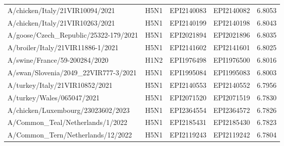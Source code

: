 \begin{tabular}{L{1.95in}|L{.25in}|L{.60in}|L{.6in}|C{1in}}
A/chicken/Italy/21VIR10094/2021&H5N1&EPI2140083&EPI2140082&6.8053\\
A/chicken/Italy/21VIR10263/2021&H5N1&EPI2140199&EPI2140198&6.8043\\
A/goose/Czech\_Republic/25322-179/2021&H5N1&EPI2021894&EPI2021896&6.8035\\
A/broiler/Italy/21VIR11886-1/2021&H5N1&EPI2141602&EPI2141601&6.8025\\
A/swine/France/59-200284/2020&H1N2&EPI1976498&EPI1976500&6.8016\\
A/swan/Slovenia/2049\_22VIR777-3/2021&H5N1&EPI1995084&EPI1995083&6.8003\\
A/turkey/Italy/21VIR10852/2021&H5N1&EPI2140553&EPI2140552&6.7956\\
A/turkey/Wales/065047/2021&H5N1&EPI2071520&EPI2071519&6.7830\\
A/chicken/Luxembourg/23023602/2023&H5N1&EPI2364554&EPI2364572&6.7826\\
A/Common\_Teal/Netherlands/1/2022&H5N1&EPI2185431&EPI2185430&6.7823\\
A/Common\_Tern/Netherlands/12/2022&H5N1&EPI2119243&EPI2119242&6.7804\\
\hline\end{tabular}

